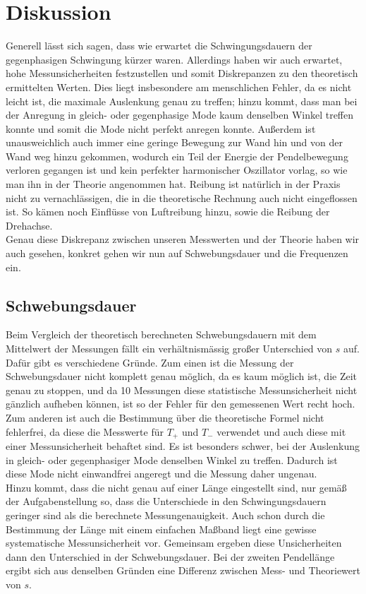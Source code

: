 \section{Diskussion}
Generell lässt sich sagen, dass wie erwartet die Schwingungsdauern der gegenphasigen Schwingung kürzer waren. Allerdings haben wir auch erwartet, hohe 
Messunsicherheiten festzustellen und somit Diskrepanzen zu den theoretisch ermittelten Werten. Dies liegt insbesondere am menschlichen Fehler, da es nicht
leicht ist, die maximale Auslenkung genau zu treffen; hinzu kommt, dass man bei der Anregung in gleich- oder gegenphasige Mode kaum denselben Winkel treffen
konnte und somit die Mode nicht perfekt anregen konnte. Außerdem ist unausweichlich auch immer eine geringe Bewegung zur Wand hin und von der Wand weg hinzu 
gekommen, wodurch ein Teil der Energie der Pendelbewegung verloren gegangen ist und kein perfekter harmonischer Oszillator vorlag, so wie man ihn in der Theorie
angenommen hat. Reibung ist natürlich in der Praxis nicht zu vernachlässigen, die in die theoretische Rechnung auch nicht eingeflossen ist. So kämen noch Einflüsse
von Luftreibung hinzu, sowie die Reibung der Drehachse.\\
Genau diese Diskrepanz zwischen unseren Messwerten und der Theorie haben wir auch gesehen, konkret gehen wir nun auf Schwebungsdauer und die Frequenzen ein.

\subsection{Schwebungsdauer}
Beim Vergleich der theoretisch berechneten Schwebungsdauern mit dem Mittelwert der Messungen fällt ein verhältnismässig großer Unterschied von $ s$ auf. 
Dafür gibt es verschiedene Gründe. Zum einen ist die Messung der Schwebungsdauer nicht komplett genau möglich, da es kaum möglich ist, die Zeit genau zu stoppen,
und da 10 Messungen diese statistische Messunsicherheit nicht gänzlich aufheben können, ist so der Fehler für den gemessenen Wert recht hoch.
Zum anderen ist auch die Bestimmung über die theoretische Formel nicht fehlerfrei, da diese die Messwerte für $T_{+}$ und $T_{-}$ verwendet und auch diese mit einer
Messunsicherheit behaftet sind. Es ist besonders schwer, bei der Auslenkung in gleich- oder gegenphasiger Mode denselben Winkel zu treffen. Dadurch ist diese Mode
nicht einwandfrei angeregt und die Messung daher ungenau.\\
Hinzu kommt, dass die nicht genau auf einer Länge eingestellt sind, nur gemäß der Aufgabenstellung so, dass die Unterschiede in den Schwingungsdauern geringer sind
als die berechnete Messungenauigkeit. Auch schon durch die Bestimmung der Länge mit einem einfachen Maßband liegt eine gewisse systematische Messunsicherheit vor.
Gemeinsam ergeben diese Unsicherheiten dann den Unterschied in der Schwebungsdauer. Bei der zweiten Pendellänge ergibt sich aus denselben Gründen eine Differenz
zwischen Mess- und Theoriewert von $ s$.

